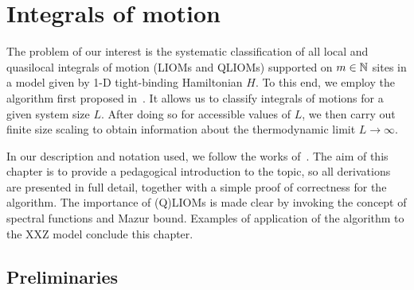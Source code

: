 \chapter{Integrals of motion}
\thispagestyle{chapterBeginStyle}

The problem of our interest is the systematic classification of all local and quasilocal integrals of
motion (LIOMs and QLIOMs) supported on \( m \in \mathbb{N} \) sites in a model given by 1-D tight-binding Hamiltonian \(H\). 
To this end, we employ the algorithm first proposed in~\textcite{Mierzejewski2015a}. It allows us to classify integrals
of motions for a given system size \(L\). After doing so for accessible values of \(L\), we then carry out finite size scaling
to obtain information about the thermodynamic limit \(L \to \infty \). 

In our description and notation used, we follow
the works of~\textcite{Mierzejewski2015a,Mierzejewski2015Approx,Mierzejewski2018}.
The aim of this chapter is to provide a pedagogical introduction to the topic,
so all derivations are presented in full detail, together with a simple proof of correctness for the algorithm.
The importance of (Q)LIOMs is made clear by invoking the concept of spectral functions and Mazur bound.
Examples of application of the algorithm to the XXZ model conclude this chapter.
\section{Preliminaries\label{sec:prelim}}

